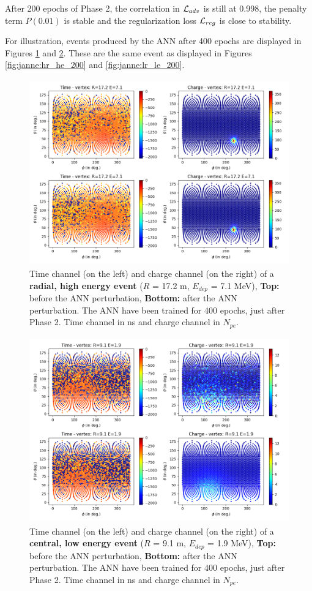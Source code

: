 \documentclass[../main.tex]{subfiles}
\begin{document}
After 200 epochs of Phase 2, the correlation in ${\cal L}_{adv}$ is still at 0.998, the penalty term $P(0.01)$ is stable and the regularization loss ${\cal L}_{reg}$ is close to stability.

For illustration, events produced by the ANN after 400 epochs are displayed in Figures \ref{fig:janne:hr_he_400} and \ref{fig:janne:lr_le_400}. These are the same event as displayed in Figures \ref{fig:janne:hr_he_200} and \ref{fig:janne:lr_le_200}.

\begin{figure}[!ht]
  \centering
  \includegraphics[height=8cm]{images/janne/events/hr_he_400.png}
  \caption{Time channel (on the left) and charge channel (on the right) of a \textbf{radial, high energy event} ($R$ = 17.2 m, $E_{dep}$ = 7.1 MeV), \textbf{Top:} before the ANN perturbation, \textbf{Bottom:} after the ANN perturbation. The ANN have been trained for 400 epochs, just after Phase 2. Time channel in ns and charge channel in $N_{pe}$.}
  \label{fig:janne:hr_he_400}
\end{figure}

\begin{figure}[!ht]
  \centering
  \includegraphics[height=8cm]{images/janne/events/lr_le_400.png}
  \caption{Time channel (on the left) and charge channel (on the right) of a \textbf{central, low energy event} ($R$ = 9.1 m, $E_{dep}$ = 1.9 MeV), \textbf{Top:} before the ANN perturbation, \textbf{Bottom:} after the ANN perturbation. The ANN have been trained for 400 epochs, just after Phase 2. Time channel in ns and charge channel in $N_{pe}$.}
  \label{fig:janne:lr_le_400}
\end{figure}
\end{document}
